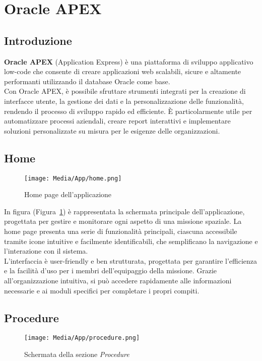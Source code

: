 \section{Oracle APEX}

\subsection{Introduzione}
\textbf{Oracle APEX} (Application Express) è una piattaforma di sviluppo applicativo low-code che consente di creare applicazioni web scalabili, sicure e altamente performanti utilizzando il database Oracle come base.\\
Con Oracle APEX, è possibile sfruttare strumenti integrati per la creazione di interfacce utente, la gestione dei dati e la personalizzazione delle funzionalità, rendendo il processo di sviluppo rapido ed efficiente. È particolarmente utile per automatizzare processi aziendali, creare report interattivi e implementare soluzioni personalizzate su misura per le esigenze delle organizzazioni.

\subsection{Home}

\begin{figure}[ht!]
    \centering
    \texttt{[image: Media/App/home.png]}
    \caption{Home page dell'applicazione}
    \label{fig:home_page}
\end{figure}

\noindent
In figura (Figura~\ref{fig:home_page}) è rappresentata la schermata principale dell'applicazione, progettata per gestire e monitorare ogni aspetto di una missione spaziale. La home page presenta una serie di funzionalità principali, ciascuna accessibile tramite icone intuitive e facilmente identificabili, che semplificano la navigazione e l'interazione con il sistema.\\
L'interfaccia è user-friendly e ben strutturata, progettata per garantire l'efficienza e la facilità d'uso per i membri dell'equipaggio della missione. Grazie all'organizzazione intuitiva, si può accedere rapidamente alle informazioni necessarie e ai moduli specifici per completare i propri compiti.

\subsection{Procedure}
\begin{figure}[ht!]
    \centering
    \texttt{[image: Media/App/procedure.png]}
    \caption{Schermata della sezione \textit{Procedure}}
    \label{fig:procedure}
\end{figure}


